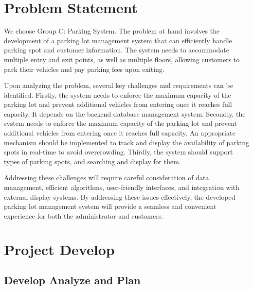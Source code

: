 \pagestyle{fancy}
\fancyhead[L]{}
\renewcommand{\headrulewidth}{2pt}
\renewcommand{\baselinestretch}{1.5}
\setcounter{page}{2} 
{\rmfamily\selectfont
\vspace{-1ex}

\hypertarget{target-analyze}{%
\section{Problem Statement}\label{target-analyze}}

We choose Group C: Parking System. The problem at hand involves the
development of a parking lot management system that can efficiently
handle parking spot and customer information. The system needs to
accommodate multiple entry and exit points, as well as multiple floors,
allowing customers to park their vehicles and pay parking fees upon exiting.

Upon analyzing the problem, several key challenges and requirements can
be identified. Firstly, the system needs to enforce the maximum capacity
of the parking lot and prevent additional vehicles from entering once it
reaches full capacity. It depends on the backend database management
system. Secondly, the system needs to enforce the maximum capacity of
the parking lot and prevent additional vehicles from entering once it
reaches full capacity. An appropriate mechanism should be implemented
to track and display the availability of parking spots in real-time to
avoid overcrowding. Thirdly, the system should support types of parking
spots, and searching and display for them.

Addressing these challenges will require careful consideration of data
management, efficient algorithms, user-friendly interfaces, and
integration with external display systems. By addressing these issues
effectively, the developed parking lot management system will provide
a seamless and convenient experience for both the administrator and
customers.

\hypertarget{project-develop}{%
\section{Project Develop}\label{project-develop}}

\hypertarget{develop-analyze-and-plan}{%
\subsection{Develop Analyze and Plan}\label{develop-analyze-and-plan}}

}
